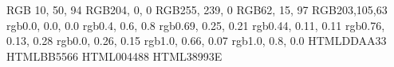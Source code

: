 
\definecolor{deep-azure}            {RGB}{  10,  50,  94}
\definecolor{rugred}                {RGB}{204, 0, 0}
\definecolor{canaryyellow}          {RGB}{255, 239, 0}
\definecolor{patrickpurple}         {RGB}{62, 15, 97}
\definecolor{storange}              {RGB}{203,105,63}
\definecolor{black}                 {rgb}{0.0, 0.0, 0.0}
\definecolor{bluegray}              {rgb}{0.4, 0.6, 0.8}
\definecolor{palecarmine}           {rgb}{0.69, 0.25, 0.21}
\definecolor{persianplum}           {rgb}{0.44, 0.11, 0.11}
\definecolor{brightmaroon}          {rgb}{0.76, 0.13, 0.28}
\definecolor{britishracinggreen}    {rgb}{0.0, 0.26, 0.15}
\definecolor{darktangerine}         {rgb}{1.0, 0.66, 0.07}
\definecolor{tangerineyellow}       {rgb}{1.0, 0.8, 0.0}
\definecolor{tpyellow}              {HTML}{DDAA33}
\definecolor{tpred}                 {HTML}{BB5566}
\definecolor{tpdblue}               {HTML}{004488}
\definecolor{tpgreen}               {HTML}{38993E}


\def\colourarray{{"deep-azure", "patrickpurple", "deep-azure", "rugred", "storange", "britishracinggreen", "black", "darktangerine", "tpyellow", "tpred", "tpdblue", "tpgreen"}}


\renewcommand*{\chapterformat}{%
  \fontsize{50}{55}\selectfont\pgfmathparse{\colourarray[\thechapter]}\textcolor{\pgfmathresult}{\thechapter}\autodot\enskip
}


